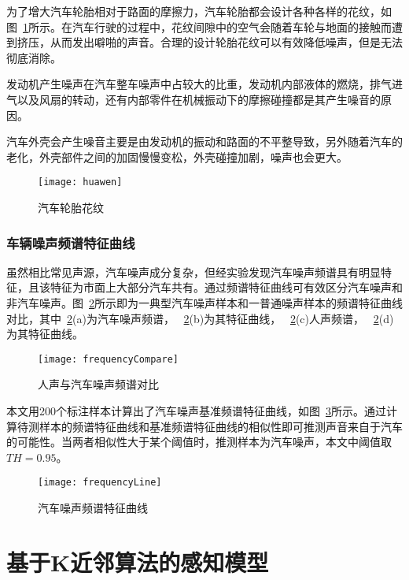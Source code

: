 为了增大汽车轮胎相对于路面的摩擦力，汽车轮胎都会设计各种各样的花纹，如图~\ref{fig:huawen}所示。在汽车行驶的过程中，花纹间隙中的空气会随着车轮与地面的接触而遭到挤压，从而发出噼啪的声音。合理的设计轮胎花纹可以有效降低噪声，但是无法彻底消除。

发动机产生噪声在汽车整车噪声中占较大的比重，发动机内部液体的燃烧，排气进气以及风扇的转动，还有内部零件在机械振动下的摩擦碰撞都是其产生噪音的原因。

汽车外壳会产生噪音主要是由发动机的振动和路面的不平整导致，另外随着汽车的老化，外壳部件之间的加固慢慢变松，外壳碰撞加剧，噪声也会更大。

\begin{figure}[htbp] %
  \centering
  \texttt{[image: huawen]}
  \caption{汽车轮胎花纹}
  \label{fig:huawen}
\end{figure}


\subsubsection{车辆噪声频谱特征曲线}
虽然相比常见声源，汽车噪声成分复杂，但经实验发现汽车噪声频谱具有明显特征，且该特征为市面上大部分汽车共有。通过频谱特征曲线可有效区分汽车噪声和非汽车噪声。图~\ref{fig:frequencyCompare}所示即为一典型汽车噪声样本和一普通噪声样本的频谱特征曲线对比，其中~\ref{fig:frequencyCompare}(a)为汽车噪声频谱， ~\ref{fig:frequencyCompare}(b)为其特征曲线， ~\ref{fig:frequencyCompare}(c)人声频谱， ~\ref{fig:frequencyCompare}(d)为其特征曲线。


\begin{figure}[htbp] %
  \centering
  \texttt{[image: frequencyCompare]}
  \caption{人声与汽车噪声频谱对比}
  \label{fig:frequencyCompare}
\end{figure}

本文用200个标注样本计算出了汽车噪声基准频谱特征曲线，如图~\ref{fig:frequencyLine}所示。通过计算待测样本的频谱特征曲线和基准频谱特征曲线的相似性即可推测声音来自于汽车的可能性。当两者相似性大于某个阈值时，推测样本为汽车噪声，本文中阈值取$TH=0.95$。

\begin{figure}[htbp] %
  \centering
  \texttt{[image: frequencyLine]}
  \caption{汽车噪声频谱特征曲线}
  \label{fig:frequencyLine}
\end{figure}


\section{基于K近邻算法的感知模型}

